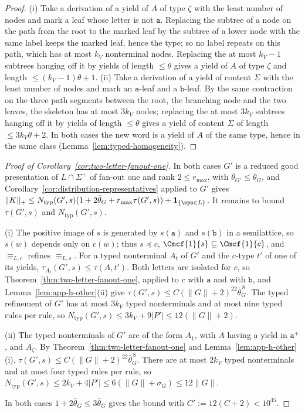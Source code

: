 \begin{proof}
(i) Take a derivation of a yield of $A$ of type $\zeta$ with the least number of
nodes and mark a leaf whose letter is not $\mathtt a$.  Replacing the subtree of a
node on the path from the root to the marked leaf by the subtree of a lower node
with the same label keeps the marked leaf, hence the type; so no label repeats on
this path, which has at most $k_V$ nonterminal nodes.  Replacing the at most
$k_V-1$ subtrees hanging off it by yields of length $\le\theta$ gives a yield of
$A$ of type $\zeta$ and length $\le(k_V-1)\theta+1$.  (ii) Take a derivation of a
yield of content $\Sigma$ with the least number of nodes and mark an $\mathtt
a$-leaf and a $\mathtt b$-leaf.  By the same contraction on the three path segments
between the root, the branching node and the two leaves, the skeleton has at most
$3k_V$ nodes; replacing the at most $3k_V$ subtrees hanging off it by yields of
length $\le\theta$ gives a yield of content $\Sigma$ of length $\le3k_V\theta+2$.
In both cases the new word is a yield of $A$ of the same type, hence in the same
class (Lemma~\ref{lem:typed-homogeneity}).
\end{proof}

\begin{proof}[Proof of Corollary~\ref{cor:two-letter-fanout-one}]
In both cases $G'$ is a reduced good presentation of $L\cap\Sigma^+$ of fan-out
one and rank $2\le r_{\max}$, with $\bar\theta_{G'}\le\bar\theta_G$, and
Corollary~\ref{cor:distribution-representatives} applied to $G'$ gives
$\|K\|_+\le N_{\mathrm{typ}}(G',s)(1+2\bar\theta_G+r_{\max}\tau(G',s))
+\mathbf 1_{\{\eps\in L\}}$.  It remains to bound $\tau(G',s)$ and
$N_{\mathrm{typ}}(G',s)$.

(i) The positive image of $s$ is generated by $s(\mathtt a)$ and $s(\mathtt b)$ in a
semilattice, so $s(w)$ depends only on $c(w)$; thus $s\preceq c$,
$\Cmcf{1}{s}\subseteq\Cmcf{1}{c}$, and $\equiv_{L,c}$ refines $\equiv_{L,s}$.
For a typed nonterminal $A_t$ of $G'$ and the $c$-type $t'$ of one of its
yields, $\tau_{A_t}(G',s)\le\tau(A,t')$.  Both letters are isolated for $c$, so
Theorem~\ref{thm:two-letter-fanout-one}, applied to $c$ with $\mathtt a$ and with
$\mathtt b$, and Lemma~\ref{lem:app-h-other}(ii) give
$\tau(G',s)\le C(\|G\|+2)^{22}\bar\theta_G^{\,8}$.  The typed refinement of $G'$
has at most $3k_V$ typed nonterminals and at most nine typed rules per rule, so
$N_{\mathrm{typ}}(G',s)\le3k_V+9|P'|\le12(\|G\|+2)$.

(ii) The typed nonterminals of $G'$ are of the form $A_1$, with $A$ having a
yield in $\mathtt a^+$, and $A_\zeta$.  By
Theorem~\ref{thm:two-letter-fanout-one} and Lemma~\ref{lem:app-h-other}(i),
$\tau(G',s)\le C(\|G\|+2)^{22}\bar\theta_G^{\,8}$.  There are at most $2k_V$ typed
nonterminals and at most four typed rules per rule, so
$N_{\mathrm{typ}}(G',s)\le2k_V+4|P'|\le6(\|G\|+\sigma_G)\le12\|G\|$.

In both cases $1+2\bar\theta_G\le3\bar\theta_G$ gives the bound with
$C':=12(C+2)<10^{45}$.
\end{proof}

